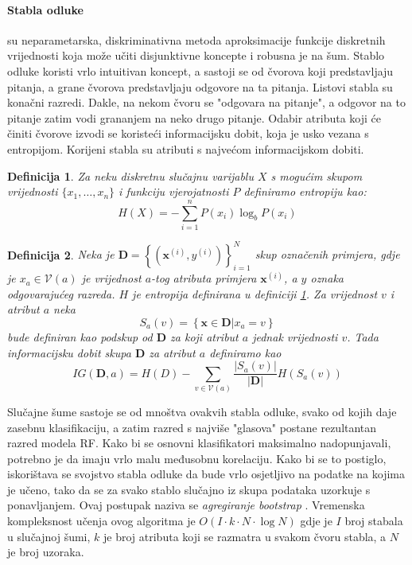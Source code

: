 \documentclass[times, utf8, diplomski]{fer}
\newtheorem{definition}{Definicija}         %
\begin{document}
\paragraph{Stabla odluke}
su neparametarska, diskriminativna metoda aproksimacije funkcije diskretnih vrijednosti koja može učiti disjunktivne koncepte i robusna je na šum. Stablo odluke koristi vrlo intuitivan koncept, a sastoji se od čvorova koji predstavljaju pitanja, a grane čvorova predstavljaju odgovore na ta pitanja. Listovi stabla su konačni razredi. Dakle, na nekom čvoru se "odgovara na pitanje", a odgovor na to pitanje zatim vodi grananjem na neko drugo pitanje. Odabir atributa koji će činiti čvorove izvodi se koristeći informacijsku dobit, koja je usko vezana s entropijom. Korijeni stabla su atributi s najvećom informacijskom dobiti.
\begin{definition}
    Za neku diskretnu slučajnu varijablu $X$ s mogućim skupom vrijednosti $\{x_1, \dots, x_n\}$ i funkciju vjerojatnosti $P$ definiramo entropiju kao:
    \begin{equation}
        H(X) = - \sum_{i=1}^n P(x_i) \log_b P(x_i)
    \end{equation}
    \label{def:entropy}
\end{definition}

\begin{definition}
    Neka je  $\bm{D} = \left\{ (\bm{x}^{(i)}, y^{(i)}) \right\}_{i=1}^N$ skup označenih primjera, gdje je $x_a \in \mathcal{V}(a)$ je vrijednost $a$-tog atributa primjera $\bm{x}^{(i)}$, a $y$ oznaka odgovarajućeg razreda. $H$ je entropija definirana u definiciji  \ref{def:entropy}. Za vrijednost $v$ i atribut $a$ neka
    \begin{equation}
        S_a(v) = \left\{ \bm{x} \in \bm{D} \vert x_a = v \right\}
    \end{equation}
    bude definiran kao podskup od $\bm{D}$ za koji atribut $a$ jednak vrijednosti $v$. Tada informacijsku dobit  skupa $\bm{D}$ za atribut $a$ definiramo kao
    \begin{equation}
        IG(\bm{D}, a) = H(D) - \sum_{v\in \mathcal{V}(a)}
        \frac{\vert S_a(v) \vert}{\vert \bm{D} \vert} H(S_a(v))
    \end{equation}
\end{definition}


Slučajne šume sastoje se od mnoštva ovakvih stabla odluke, svako od kojih daje zasebnu klasifikaciju, a zatim razred s najviše "glasova" postane rezultantan razred modela RF. Kako bi se osnovni klasifikatori maksimalno nadopunjavali, potrebno je da imaju vrlo malu međusobnu korelaciju. Kako bi se to postiglo, iskorištava se svojstvo stabla odluke da bude vrlo osjetljivo na podatke na kojima je učeno, tako da se za svako stablo slučajno iz skupa podataka uzorkuje s ponavljanjem. Ovaj postupak naziva se \emph{agregiranje bootstrap} . Vremenska kompleksnost učenja ovog algoritma je $O(I \cdot k \cdot N \cdot \log N)$ gdje je $I$ broj stabala u slučajnoj šumi, $k$ je broj atributa koji se razmatra u svakom čvoru stabla, a $N$ je broj uzoraka.
\end{document}
